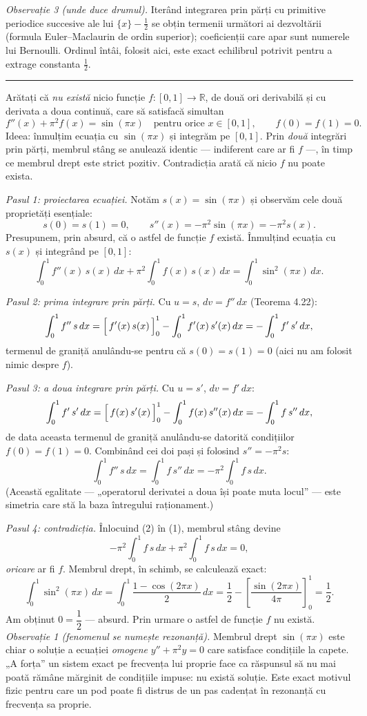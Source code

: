 \emph{Observație 3 (unde duce drumul).} Iterând integrarea prin părți cu primitive periodice succesive ale lui $\{x\}-\frac12$ se obțin termenii următori ai dezvoltării (formula Euler--Maclaurin de ordin superior); coeficienții care apar sunt numerele lui Bernoulli. Ordinul întâi, folosit aici, este exact echilibrul potrivit pentru a extrage constanta $\frac12$.
\vspace{1mm}\hrule

Arătați că \emph{nu există} nicio funcție $f:[0,1]\to\mathbb{R}$, de două ori derivabilă și cu derivata a doua continuă, care să satisfacă simultan
\[ f''(x)+\pi^{2}f(x)=\sin(\pi x)\quad\text{pentru orice }x\in[0,1],\qquad f(0)=f(1)=0 . \]
\sol Ideea: înmulțim ecuația cu $\sin(\pi x)$ și integrăm pe $[0,1]$. Prin \emph{două} integrări prin părți, membrul stâng se anulează identic --- indiferent care ar fi $f$ ---, în timp ce membrul drept este strict pozitiv. Contradicția arată că nicio $f$ nu poate exista.

\emph{Pasul 1: proiectarea ecuației.} Notăm $s(x)=\sin(\pi x)$ și observăm cele două proprietăți esențiale:
\[ s(0)=s(1)=0,\qquad s''(x)=-\pi^{2}\sin(\pi x)=-\pi^{2}s(x) . \]
Presupunem, prin absurd, că o astfel de funcție $f$ există. Înmulțind ecuația cu $s(x)$ și integrând pe $[0,1]$:
\[ \int_{0}^{1}f''(x)\,s(x)\,dx+\pi^{2}\int_{0}^{1}f(x)\,s(x)\,dx=\int_{0}^{1}\sin^{2}(\pi x)\,dx . \tag{1} \]

\emph{Pasul 2: prima integrare prin părți.} Cu $u=s$, $dv=f''\,dx$ (Teorema 4.22):
\[ \int_{0}^{1}f''\,s\,dx=\Bigl[\,f'(x)\,s(x)\,\Bigr]_{0}^{1}-\int_{0}^{1}f'(x)\,s'(x)\,dx=-\int_{0}^{1}f'\,s'\,dx , \]
termenul de graniță anulându-se pentru că $s(0)=s(1)=0$ (aici nu am folosit nimic despre $f$).

\emph{Pasul 3: a doua integrare prin părți.} Cu $u=s'$, $dv=f'\,dx$:
\[ \int_{0}^{1}f'\,s'\,dx=\Bigl[\,f(x)\,s'(x)\,\Bigr]_{0}^{1}-\int_{0}^{1}f(x)\,s''(x)\,dx=-\int_{0}^{1}f\,s''\,dx , \]
de data aceasta termenul de graniță anulându-se datorită condițiilor $f(0)=f(1)=0$. Combinând cei doi pași și folosind $s''=-\pi^{2}s$:
\[ \int_{0}^{1}f''\,s\,dx=\int_{0}^{1}f\,s''\,dx=-\pi^{2}\int_{0}^{1}f\,s\,dx . \tag{2} \]
(Această egalitate --- „operatorul derivatei a doua își poate muta locul'' --- este simetria care stă la baza întregului raționament.)

\emph{Pasul 4: contradicția.} Înlocuind (2) în (1), membrul stâng devine
\[ -\pi^{2}\int_{0}^{1}f\,s\,dx+\pi^{2}\int_{0}^{1}f\,s\,dx=0 , \]
\emph{oricare} ar fi $f$. Membrul drept, în schimb, se calculează exact:
\[ \int_{0}^{1}\sin^{2}(\pi x)\,dx=\int_{0}^{1}\frac{1-\cos(2\pi x)}{2}\,dx=\frac12-\left[\frac{\sin(2\pi x)}{4\pi}\right]_{0}^{1}=\frac12 . \]
Am obținut $0=\dfrac12$ --- absurd. Prin urmare o astfel de funcție $f$ nu există.\\[2pt]
\emph{Observație 1 (fenomenul se numește rezonanță).} Membrul drept $\sin(\pi x)$ este chiar o soluție a ecuației \emph{omogene} $y''+\pi^{2}y=0$ care satisface condițiile la capete. „A forța'' un sistem exact pe frecvența lui proprie face ca răspunsul să nu mai poată rămâne mărginit de condițiile impuse: nu există soluție. Este exact motivul fizic pentru care un pod poate fi distrus de un pas cadențat în rezonanță cu frecvența sa proprie.

